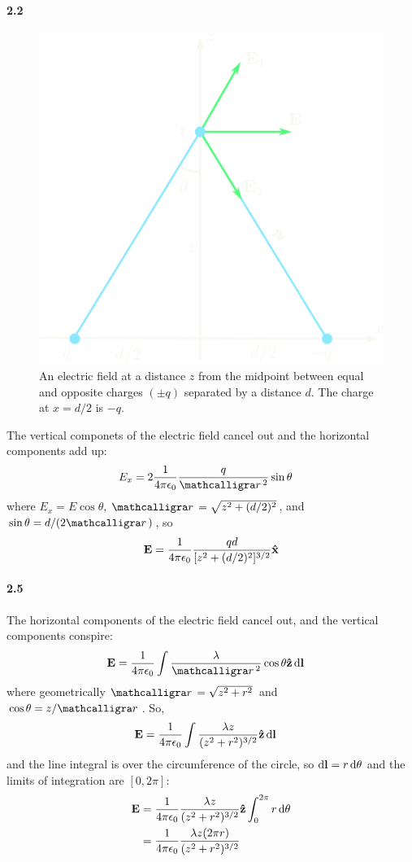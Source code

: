 \documentclass[../main.tex]{subfiles}
\begin{document}
\pagestyle{fancy}

\setcounter{section}{2}
\paragraph{2.2}
\begin{figure}[ht]
    \centering
    \includegraphics[width=0.5\linewidth]{images/hw2_2.png}
    \captionsetup{width=0.8\linewidth}
    \caption{An electric field at a distance $z$ from the midpoint between equal and opposite
    charges $(\pm q)$ separated by a distance $d$. The charge at $x = d/2$ is $-q$.}
    \label{fig:2_2}
\end{figure}
The vertical componets of the electric field cancel out and the horizontal components add up:
\begin{align*}
    E_x &= 2 \frac{1}{4\pi\epsilon_0} \frac{q}{\scriptr^2} \sin \theta
\end{align*}
where $E_x = E \cos \theta$, $\scriptr = \sqrt{z^2 + (d/2)^2}$, and $\sin \theta = d / (2\scriptr)$,
so 
\begin{align*}
    \vb{E} = \frac{1}{4\pi\epsilon_0} \frac{qd}{[z^2 + (d/2)^2]^{3/2}} \vu{x}
\end{align*}

\newpage
\paragraph{2.5}
The horizontal components of the electric field cancel out, and the vertical components conspire:
\begin{align*}
    \vb{E} &= \frac{1}{4\pi\epsilon_0}
        \int \frac{\lambda}{\scriptr^2} \cos\theta \vu{z} \dd{\vb{l}}
\end{align*}
where geometrically $\scriptr = \sqrt{z^2 + r^2}$ and $\cos\theta = z / \scriptr$. So,
\begin{align*}
    \vb{E} &= \frac{1}{4\pi\epsilon_0}
        \int \frac{\lambda z}{(z^2 + r^2)^{3/2}} \vu{z} \dd{\vb{l}}
\end{align*}
and the line integral is over the circumference of the circle, so $\dd{\vb{l}} = r \dd{\theta}$ and
the limits of integration are $[0, 2\pi]$:
\begin{align*}
    \vb{E} &= \frac{1}{4\pi\epsilon_0} \frac{\lambda z}{(z^2 + r^2)^{3/2}} \vu{z}
        \int_0^{2\pi}  r \dd{\theta} \\
    &= \frac{1}{4\pi\epsilon_0}
        \frac{\lambda z (2\pi r)}{(z^2 + r^2)^{3/2}}
\end{align*}
\end{document}

